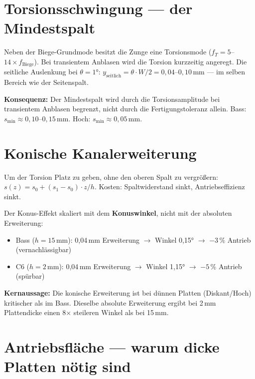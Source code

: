 \documentclass[11pt,a4paper]{article}
\begin{document}
\section{Torsionsschwingung --- der Mindestspalt}

Neben der Biege-Grundmode besitzt die Zunge eine Torsionsmode ($f_T = 5$--$14 \times f_\text{Biege}$). Bei transientem Anblasen wird die Torsion kurzzeitig angeregt. Die seitliche Auslenkung bei $\theta = 1°$: $y_\text{seitlich} = \theta \cdot W/2 = 0{,}04$--$0{,}10$\,mm --- im selben Bereich wie der Seitenspalt.

\begin{keybox}
\textbf{Konsequenz:} Der Mindestspalt wird durch die Torsionsamplitude bei transientem Anblasen begrenzt, nicht durch die Fertigungstoleranz allein. Bass: $s_\text{min} \approx 0{,}10$--$0{,}15$\,mm. Hoch: $s_\text{min} \approx 0{,}05$\,mm.
\end{keybox}

\section{Konische Kanalerweiterung}

Um der Torsion Platz zu geben, ohne den oberen Spalt zu vergrößern: $s(z) = s_0 + (s_1 - s_0) \cdot z/h$. Kosten: Spaltwiderstand sinkt, Antriebseffizienz sinkt.

Der Konus-Effekt skaliert mit dem \textbf{Konuswinkel}, nicht mit der absoluten Erweiterung:

\begin{itemize}
\item Bass ($h = 15$\,mm): 0,04\,mm Erweiterung $\to$ Winkel 0,15° $\to$ $-3\,\%$ Antrieb (vernachlässigbar)
\item C6 ($h = 2$\,mm): 0,04\,mm Erweiterung $\to$ Winkel 1,15° $\to$ $-5$\,\% Antrieb (spürbar)
\end{itemize}

\begin{keybox}
\textbf{Kernaussage:} Die konische Erweiterung ist bei dünnen Platten (Diskant/Hoch) kritischer als im Bass. Dieselbe absolute Erweiterung ergibt bei 2\,mm Plattendicke einen 8$\times$ steileren Winkel als bei 15\,mm.
\end{keybox}

\section{Antriebsfläche --- warum dicke Platten nötig sind}
\end{document}
